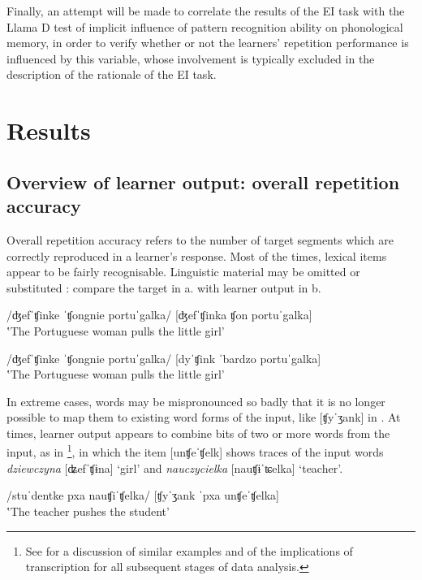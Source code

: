 Finally, an attempt will be made to correlate the results of the EI task with the Llama D test of implicit influence of pattern recognition ability on phonological memory, in order to verify whether or not the learners’ repetition performance is influenced by this variable, whose involvement is typically excluded in the description of the rationale of the EI task.

\section{Results}\label{sec:04:2}

\subsection{Overview of learner output: overall repetition accuracy}\label{sec:04:2.1}

Overall repetition accuracy refers to the number of target segments which are correctly reproduced in a learner’s response. Most of the times, lexical items appear to be fairly recognisable. Linguistic material may be omitted  or substituted : compare the target in a. with learner output in b. 

\ea%
    \label{ex:04:1}
    \ea\label{ex:04:1a}
    /ʤefˈʧinke ˈʧongnie portuˈgalka/
    \ex\label{ex:04:1b}
    [ʤefˈʧinka ʧon portuˈgalka]\\
    ‛The Portuguese woman pulls the little girl'
    \z
\z

\ea%
    \label{ex:04:2}
    \ea\label{ex:04:2a}
    /ʤefˈʧinke ˈʧongnie portuˈgalka/
    \ex\label{ex:04:2b}
    [dyˈʧink ˈbardzo portuˈgalka]\\
    ‛The Portuguese woman pulls the little girl'
    \z
\z

  In extreme cases, words may be mispronounced so badly that it is no longer possible to map them to existing word forms of the input, like [ʧyˈʒank] in . At times, learner output appears to combine bits of two or more words from the input, as in \footnote{See \citet{Saturno2015} for a discussion of similar examples and of the implications of transcription for all subsequent stages of data analysis.}, in which the item [unʧeˈʧelk] shows traces of the input words \textit{dziewczyna} [ʥefˈʧɨna] ‘girl’ and \textit{nauczycielka} [nauʧɨˈʨelka] ‘teacher’.

\ea%
    \label{ex:04:3}
    \ea\label{ex:04:3a}
    /stuˈdentke pxa nauʧiˈʧelka/
    \ex\label{ex:04:3b}
    [ʧyˈʒank ˈpxa unʧeˈʧelka]\\
    ‛The teacher pushes the student'
    \z
\z

